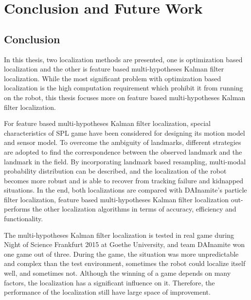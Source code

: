 \chapter{Conclusion and Future Work\label{cha:chapter7}}

\section{Conclusion\label{sec:conclusion}}
In this thesis, two localization methods are presented, one is optimization based localization and the other is feature based multi-hypotheses Kalman filter localization. While the most significant problem with optimization based localization is the high computation requirement which prohibit it from running on the robot, this thesis focuses more on feature based multi-hypotheses Kalman filter localization. 

For feature based multi-hypotheses Kalman filter localization, special characteristics of \gls{SPL} game have been considered for designing its motion model and sensor model. To overcome the ambiguity of landmarks, different strategies are adopted to find the correspondence between the observed landmark and the landmark in the field. By incorporating landmark based resampling, multi-modal probability distribution can be described, and the localization of the robot becomes more robust and is able to recover from tracking failure and kidnapped situations. In the end, both localizations are compared with DAInamite's particle filter localization, feature based  multi-hypotheses Kalman filter localization out-performs the other localization algorithms in terms of accuracy, efficiency and functionality. 

The multi-hypotheses Kalman filter localization is tested in real game during Night of Science Frankfurt 2015 at Goethe University, and team DAInamite won one game out of three. During the game, the situation was more unpredictable and complex than the test environment, sometimes the robot could localize itself well, and sometimes not. Although the winning of a game depends on many factors, the localization has a significant influence on it. Therefore, the performance of the localization still have large space of improvement.  

